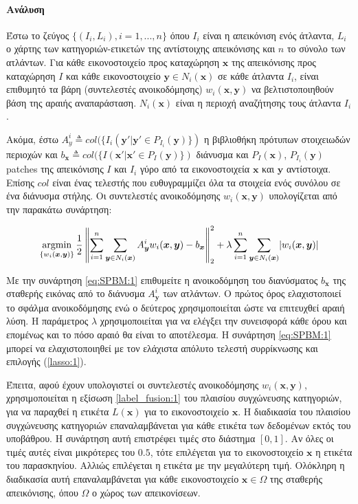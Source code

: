 \documentclass[a4paper,12pt]{article}
\newcommand{\paragraphLine}[1]{\paragraph{#1}\mbox{}}
\newcommand{\argminB}{\mathop{\mathrm{argmin}}}
\DeclarePairedDelimiter\abs{\lvert}{\rvert}
\newcommand\norm[1]{\left\lVert#1\right\rVert}
\begin{document}
\paragraphLine{Ανάλυση}

Έστω το ζεύγος $\{(I_i,L_i), i=1,...,n\}$ όπου $I_i$ είναι η
απεικόνιση ενός άτλαντα, $L_i$ ο χάρτης των κατηγοριών-ετικετών της αντίστοιχης
απεικόνισης και $n$ το σύνολο των ατλάντων. Για κάθε εικονοστοιχείο προς
καταχώρηση $\bm{x}$ της απεικόνισης προς καταχώρηση $I$ και κάθε εικονοστοιχείο
$\bm{y} \in N_i(\bm{x})$ σε κάθε άτλαντα $I_i$, είναι επιθυμητό τα βάρη
(συντελεστές ανοικοδόμησης) $w_i(\bm{x},\bm{y})$ να βελτιστοποιηθούν βάση της
αραιής αναπαράσταση. $N_i(\bm{x})$ είναι η περιοχή αναζήτησης τους άτλαντα
$I_i$.

Ακόμα, έστω $A^i_y \triangleq col(\{I_i(\bm{y'} | \bm{y'} \in
P_{I_i}(\bm{y})\})$ η βιβλιοθήκη πρότυπων στοιχειωδών περιοχών και $b_{\bm{x}}
\triangleq col( \{ I(\bm{x'} | \bm{x'} \in P_{I}(\bm{y})\})$ διάνυσμα και
$P_{I}(\bm{x})$, $P_{I_i}(\bm{y})$ patches της απεικόνισης $I$ και $I_i$ γύρο
από τα εικονοστοιχεία $\bm{x}$ και $\bm{y}$ αντίστοιχα. Επίσης $col$ είναι ένας
τελεστής που ευθυγραμμίζει όλα τα στοιχεία ενός συνόλου σε ένα διάνυσμα στήλης.
Οι συντελεστές ανοικοδόμησης $w_i(\bm{x},\bm{y})$ υπολογίζεται από την παρακάτω
συνάρτηση:

\begin{equation} \label{eq:SPBM:1}
    \argminB_{\{w_i(\bm{x},\bm{y})\}} { \frac{1} {2} \norm {\sum_{i=1}^{n}
    \sum_{\bm{y} \in N_i(\bm{x})} A_{\bm{y}}^i w_i(\bm{x},\bm{y}) -
    b_{\bm{x}}}_2^2 }
    + \lambda \sum_{i=1}^{n} \sum_{\bm{y} \in N_i(\bm{x})}
    \abs{w_i(\bm{x},\bm{y})}
\end{equation}

Με την συνάρτηση \eqref{eq:SPBM:1} επιθυμείτε η ανοικοδόμηση του διανύσματος
$b_{\bm{x}}$ της σταθερής εικόνας από το διάνυσμα $A^i_{\bm{y}}$ των ατλάντων. Ο
πρώτος όρος ελαχιστοποιεί το σφάλμα ανοικοδόμησης ενώ ο δεύτερος χρησιμοποιείται
ώστε να επιτευχθεί αραιή λύση. Η παράμετρος $\lambda$ χρησιμοποιείται για να
ελέγξει την συνεισφορά κάθε όρου και επομένως και το πόσο αραιό θα είναι το
αποτέλεσμα. Η συνάρτηση \eqref{eq:SPBM:1} μπορεί να ελαχιστοποιηθεί με τον
ελάχιστα απόλυτο τελεστή συρρίκνωσης και επιλογής (\ref{lasso:1}).

Έπειτα, αφού έχουν υπολογιστεί οι συντελεστές ανοικοδόμησης $w_i(\bm{x},\bm{y})$, 
χρησιμοποιείται η εξίσωση \eqref{label_fusion:1} του πλαισίου συγχώνευσης
κατηγοριών, για να παραχθεί η ετικέτα $L(\bm{x})$ για το εικονοστοιχείο
$\bm{x}$.  Η διαδικασία του πλαισίου συγχώνευσης κατηγοριών επαναλαμβάνεται για
κάθε ετικέτα των δεδομένων εκτός του υποβάθρου. Η συνάρτηση αυτή επιστρέφει
τιμές στο διάστημα $[0,1]$. Αν όλες οι τιμές αυτές είναι μικρότερες του $0.5$,
τότε επιλέγεται για το εικονοστοιχείο $\bm{x}$ η ετικέτα του παρασκηνίου. Αλλιώς
επιλέγεται η ετικέτα με την μεγαλύτερη τιμή. Ολόκληρη η διαδικασία αυτή
επαναλαμβάνεται για κάθε εικονοστοιχείο $\bm{x} \in \Omega$ της σταθερής
απεικόνισης, όπου $\Omega$ ο χώρος των απεικονίσεων.
\end{document}
